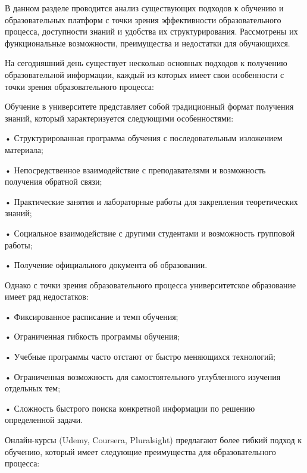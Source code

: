 {\gostFont

  \par \redline В данном разделе проводится анализ существующих подходов к обучению и образовательных платформ с точки зрения эффективности образовательного процесса, доступности знаний и удобства их структурирования. Рассмотрены их функциональные возможности, преимущества и недостатки для обучающихся.

  \par \redline На сегодняшний день существует несколько основных подходов к получению образовательной информации, каждый из которых имеет свои особенности с точки зрения образовательного процесса:

  \par \redline Обучение в университете представляет собой традиционный формат получения знаний, который характеризуется следующими особенностями:
  
  \par \redline • Структурированная программа обучения с последовательным изложением материала;
  \par \redline • Непосредственное взаимодействие с преподавателями и возможность получения обратной связи;
  \par \redline • Практические занятия и лабораторные работы для закрепления теоретических знаний;
  \par \redline • Социальное взаимодействие с другими студентами и возможность групповой работы;
  \par \redline • Получение официального документа об образовании.
  
  \par \redline Однако с точки зрения образовательного процесса университетское образование имеет ряд недостатков:
  
  \par \redline • Фиксированное расписание и темп обучения;
  \par \redline • Ограниченная гибкость программы обучения;
  \par \redline • Учебные программы часто отстают от быстро меняющихся технологий;
  \par \redline • Ограниченная возможность для самостоятельного углубленного изучения отдельных тем;
  \par \redline • Сложность быстрого поиска конкретной информации по решению определенной задачи.

  \par \redline Онлайн-курсы (Udemy, Coursera, Pluralsight) предлагают более гибкий подход к обучению, который имеет следующие преимущества для образовательного процесса:
  
}
